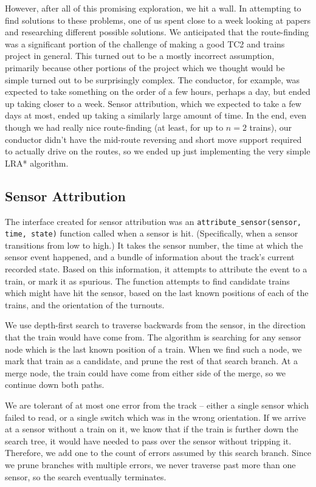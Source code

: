 \documentclass{article}
\begin{document}
However, after all of this promising exploration, we hit a wall. In attempting
to find solutions to these problems, one of us spent close to a week looking
at papers and researching different possible solutions.
We anticipated that the route-finding was a significant portion of the challenge
of making a good TC2 and trains project in general. This turned out to be a
mostly incorrect assumption, primarily because other portions of the project
which we thought would be simple turned out to be surprisingly complex. The
conductor, for example, was expected to take something on the order of a few
hours, perhaps a day, but ended up taking closer to a week. Sensor attribution,
which we expected to take a few days at most, ended up taking a similarly
large amount of time. In the end, even though we had really nice route-finding
(at least, for up to $n=2$ trains), our conductor didn't have the mid-route
reversing and short move support required to actually drive on the routes, so
we ended up just implementing the very simple LRA* algorithm.

\subsection{Sensor Attribution}
The interface created for sensor attribution was an \texttt{attribute\_sensor(sensor, time, state)}
function called when a sensor is hit.
(Specifically, when a sensor transitions from low to high.)
It takes the sensor number, the time at which the sensor event happened,
and a bundle of information about the track's current recorded state.
Based on this information, it attempts to attribute the event to a train, or mark it as spurious.
The function attempts to find candidate trains which might have hit the sensor, based on the last
known positions of each of the trains, and the orientation of the turnouts.

We use depth-first search to traverse backwards from the sensor, in the direction that the train would have come from.
The algorithm is searching for any sensor node which is the last known position of a train.
When we find such a node, we mark that train as a candidate, and prune the rest of that search branch.
At a merge node, the train could have come from either side of the merge,
so we continue down both paths.

We are tolerant of at most one error from the track -- either a single sensor
which failed to read, or a single switch which was in the wrong orientation.
If we arrive at a sensor without a train on it, we know that if the train is
further down the search tree, it would have needed to pass over the sensor without tripping it.
Therefore, we add one to the count of errors assumed by this search branch.
Since we prune branches with multiple errors, we never traverse past more than one sensor,
so the search eventually terminates.
\end{document}

